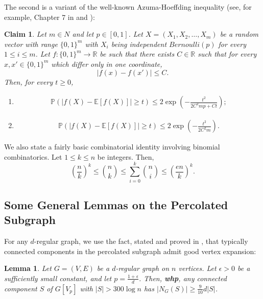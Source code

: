 \documentclass[notitlepage]{scrartcl}
\newtheorem{lemma}[thm]{Lemma}
\newtheorem{claim}[thm]{Claim}
\begin{document}
The second is a variant of the well-known Azuma-Hoeffding inequality (see, for example, Chapter 7 in \cite{zbMATH06566409} and \cite[Corollary 6]{zbMATH06788897}):
\begin{claim} \label{hoef}
    Let $m \in N$ and let $p \in [0, 1]$. Let $X = (X_1, X_2, \dots , X_m)$ be a random vector with range $\{0, 1\}^m$ with $X_i$ being independent $Bernoulli(p)$ for every $1\le i\le m$. Let $f:\{0, 1\}^m \xrightarrow{} \mathbb{R}$ be such that there exists $C \in \mathbb{R}$ such that for every $x, x' \in \{0, 1\}^m$ which differ only in one coordinate,
    $$|f(x)-f(x')|\leq C.$$
    Then, for every $t \geq 0$,
    \begin{enumerate}
        \item \begin{align*}
            \mathbb{P}(|f(X)-\mathbb{E}[f(X)]|\geq t)\leq 2\exp \left(-\frac{t^2}{2C^2mp+Ct}\right);
        \end{align*}
        \item \begin{align*}
            \mathbb{P}(|f(X)-\mathbb{E}[f(X)]|\geq t)\leq 2\exp \left(-\frac{t^2}{2C^2m}\right).
        \end{align*}
    \end{enumerate}
\end{claim}

We also state a fairly basic combinatorial identity involving binomial combinatorics. Let $1\le k\le n$ be integers. Then,
\begin{equation}\label{identity}
    \left(\frac{n}{k}\right)^k\le \binom{n}{k}\le \sum_{i=0}^k \binom{n}{i}\le \left(\frac{en}{k}\right)^k.
\end{equation}

\subsection{Some General Lemmas on the Percolated Subgraph}

For any $d$-regular graph, we use the fact, stated and proved in \cite[Claim 2.1]{zbMATH07770097}, that typically connected components in the percolated subgraph admit good vertex expansion:

\begin{lemma}\label{expansion}
    Let $G = (V, E)$ be a $d$-regular graph on $n$ vertices. Let $\epsilon>0$ be a sufficiently small constant, and let $p=\frac{1+\epsilon}{d}$. Then, \textbf{whp}, any connected component $S$ of $G[V_p]$ with $|S|>300\log n$ has $|N_G(S)|\ge \frac{9}{10}d|S|$.
\end{lemma}
\end{document}
